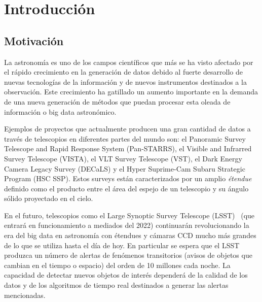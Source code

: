\chapter{Introducción}
\label{ch:introduction}

\section{Motivaci\'on}
La astronomía es uno de los campos científicos que más se ha visto afectado por el rápido crecimiento en la generación de datos debido al fuerte desarrollo de nuevas tecnologías de la información y  de nuevos instrumentos destinados a la observación. Este crecimiento ha gatillado un aumento importante en la demanda de una nueva generaci\'on de m\'etodos que puedan procesar esta oleada de informaci\'on o big data astron\'omico.
\bigskip

Ejemplos de proyectos que actualmente producen una gran cantidad de datos a trav\'es de telescopios en diferentes partes del mundo son: el Panoramic Survey Telescope and Rapid Response System (Pan-STARRS)\cite{pan}, el Visible and Infrarred Survey Telescope (VISTA)\cite{vista}, el VLT Survey Telescope (VST)\cite{vst}, el Dark Energy Camera Legacy Survey (DECaLS)\cite{decals} y el Hyper Suprime-Cam Subaru Strategic Program (HSC SSP)\cite{ssp}. Estos surveys est\'an caracterizados por un amplio \textit{\'etendue} definido como el producto entre el \'area del espejo de un telescopio y su \'angulo s\'olido proyectado en el cielo.
\bigskip

En el futuro, telescopios como el Large Synoptic Survey Telescope (LSST)~\cite{lsst} (que entrará en funcionamiento a mediados del 2022) continuar\'an revolucionando la era del big data en astronom\'ia con \'etendues y c\'amaras CCD mucho m\'as grandes de lo que se utiliza hasta el d\'ia de hoy. En particular se espera que el LSST produzca un n\'umero de alertas de fen\'omenos transitorios (avisos de objetos que cambian en el tiempo o espacio) del orden de 10 millones cada noche. La capacidad de detectar nuevos objetos de inter\'es depender\'a de la calidad de los datos y de los algoritmos de tiempo real  destinados a generar las alertas mencionadas. 
\bigskip

